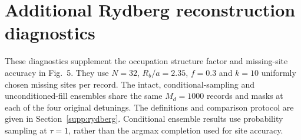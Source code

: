 \documentclass[11pt,a4paper]{article}
\newcommand{\TBD}[1]{\textcolor{red!70!black}{\textsf{[TBD: #1]}}}
\newcommand{\sechead}[2]{\section{#2}}
\newcommand{\subhead}[1]{\subsection*{#1}}
\begin{document}



\sechead{S8}{Additional Rydberg reconstruction diagnostics}
\label{supp:rydberg_results}

These diagnostics supplement the occupation structure factor and
missing-site accuracy in Fig.~5. They use $N=32$, $R_b/a=2.35$,
$f=0.3$ and $k=10$ uniformly chosen missing sites per record.
The intact, conditional-sampling and unconditioned-fill ensembles
share the same $M_d=1000$ records and masks at each of the four original
detunings. The definitions and comparison protocol are given in
Section~\ref{supp:rydberg}. Conditional ensemble results use probability sampling at
$\tau=1$, rather than the argmax completion used for site accuracy.
\end{document}
